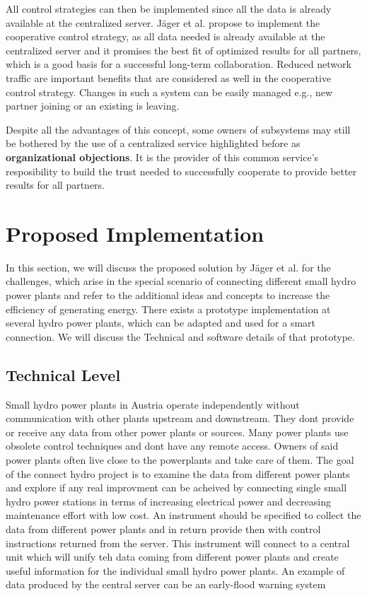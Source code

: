 All control strategies can then be implemented since all the data is already available at the centralized server. 
Jäger et al.\cite{SEIT2017} propose to implement the cooperative control strategy, as all data needed is already available at the centralized server and it promises the best fit of optimized results for all partners, which is a good basis for a successful long-term collaboration. Reduced network traffic are important benefits that are considered as well in the cooperative control strategy. Changes in such a system can be easily managed e.g., new partner joining or an existing is leaving. 

Despite all the advantages of this concept, some owners of subsystems may still be bothered by the use of a centralized service highlighted before as \textbf{organizational objections}. It is the provider of this common service's resposibility to build the trust needed to successfully cooperate to provide better results for all partners.\cite{SEIT2017}

\section{Proposed Implementation}
In this section, we will discuss the proposed solution by Jäger et al.\cite{SEIT2017} for the challenges, which arise in the special scenario of connecting different small hydro power plants and refer to the additional ideas and concepts to increase the efficiency of generating energy. There exists a prototype implementation at several hydro power plants, which can be adapted and used for a smart connection. We will discuss the Technical and software details of that prototype.
\subsection{Technical Level}
Small hydro power plants in Austria operate independently without communication with other plants upstream and downstream. They dont provide or receive any data from other power plants or sources. Many power plants use obsolete control techniques and dont have any remote access. Owners of said power plants often live close to the powerplants and take care of them. The goal of the connect hydro project is to examine the data from different power plants and explore if any real improvment can be acheived by connecting single small hydro power stations in terms of increasing electrical power and decreasing maintenance effort with low cost. An instrument should be specified to collect the data from different power plants and in return provide then with control instructions returned from the server. This instrument will connect to a central unit which will unify teh data coming from different power plants and create useful information for the individual small hydro power plants. An example of data produced by the central server can be an early-flood warning system
